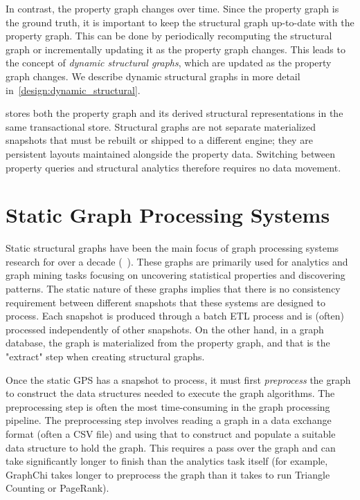 In contrast, the property graph changes over time.
Since the property graph is the ground truth, it is important to keep the structural graph up-to-date with the property graph.
This can be done by periodically recomputing the structural graph or incrementally updating it as the property graph changes.
This leads to the concept of \emph{dynamic structural graphs}, which are updated as the property graph changes.
We describe dynamic structural graphs in more detail in~\autoref{design:dynamic_structural}.

\project{} stores both the property graph and its derived structural representations in the same transactional \wt{} store.
Structural graphs are not separate materialized snapshots that must be rebuilt or shipped to a different engine; they are persistent layouts maintained alongside the property data.
Switching between property queries and structural analytics therefore requires no data movement.


\section{Static Graph Processing Systems}
\label{design:static_structural}

Static structural graphs have been the main focus of graph processing systems research for over a decade (~\cite{malewicz2010pregel,gonzalez2014graphx, zhu2016gemini, xing2015petuum, low2012distributed,gonzalez2012powergraph, powerlyra2019,shun2013ligra, nguyen2013lightweight, zhu2016gemini, graphmat, lakhotia2020gpop, beamer2015gap, kim2022blaze, ai2018clip,zheng2015flashgraph}).
These graphs are primarily used for analytics and graph mining tasks focusing on uncovering statistical properties and discovering patterns.
The static nature of these graphs implies that there is no consistency requirement between different snapshots that these systems are designed to process.
Each snapshot is produced through a batch \ac{ETL} process and is (often) processed independently of other snapshots.
On the other hand, in a graph database, the graph is materialized from the property graph, and that is the "extract" step when creating structural graphs.

Once the static GPS has a snapshot to process, it must first \emph{preprocess} the graph to construct the data structures needed to execute the graph algorithms.
The preprocessing step is often the most time-consuming in the graph processing pipeline.
The preprocessing step involves reading a graph in a data exchange format (often a CSV file) and using that to construct and populate a suitable data structure to hold the graph.
This requires a pass over the graph and can take significantly longer to finish than the analytics task itself (for example, GraphChi takes longer to preprocess the graph than it takes to run Triangle Counting or PageRank).


